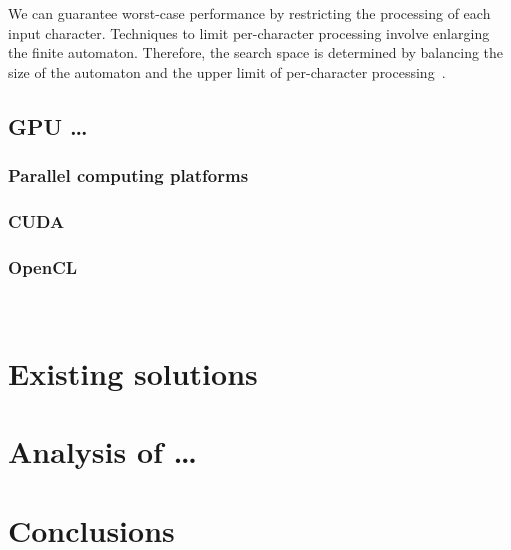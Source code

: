 \documentclass[10pt,onecolumn,twoside,english,a4paper]{article}
\begin{document}
We can guarantee worst-case performance by restricting the processing of each input character. Techniques to limit per-character processing involve enlarging the finite automaton. Therefore, the search space is determined by balancing the size of the automaton and the upper limit of per-character processing~\cite{Nourian:DemystifyingFSA}.


\subsection{GPU \ldots} \label{GPU}

\subsubsection{Parallel computing platforms} \label{Parallel computing platforms}

\subsubsection{CUDA} \label{Cuda}

\subsubsection{OpenCL} \label{OpenCL}
\
\section{Existing solutions} \label{Existing solutions}

\section{Analysis of \ldots} \label{Analysis of }

\section{Conclusions} \label{Conclusions} %



\end{document}
